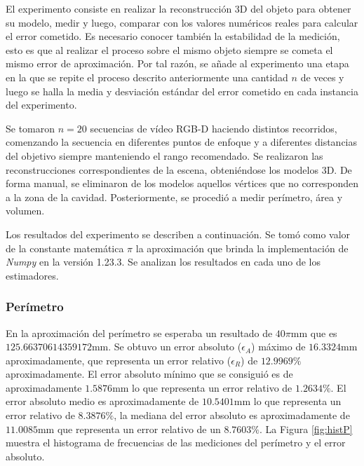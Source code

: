 El experimento consiste en realizar la reconstrucción 3D del objeto para obtener su modelo, medir y luego, comparar con los valores numéricos reales para calcular el error cometido. Es necesario conocer también la estabilidad de la medición, esto es que al realizar el proceso sobre el mismo objeto siempre se cometa el mismo error de aproximación. Por tal razón, se añade al experimento una etapa en la que se repite el proceso descrito anteriormente una cantidad $n$ de veces y luego se halla la media y desviación estándar del error cometido en cada instancia del experimento.

Se tomaron $n = 20$ secuencias de vídeo RGB-D haciendo distintos recorridos, comenzando la secuencia en diferentes puntos de enfoque y a diferentes distancias del objetivo siempre manteniendo el rango recomendado. Se realizaron las reconstrucciones correspondientes de la escena, obteniéndose los modelos 3D. De forma manual, se eliminaron de los modelos aquellos vértices que no corresponden a la zona de la cavidad. Posteriormente, se procedió a medir perímetro, área y volumen. 

Los resultados del experimento se describen a continuación. Se tomó como valor de la constante matemática $\pi$ la aproximación que brinda la implementación de \textit{Numpy} en la versión 1.23.3. Se analizan los resultados en cada uno de los estimadores.

\subsubsection{Perímetro}

En la aproximación del perímetro se esperaba un resultado de $40\pi\text{mm}$ que es $125.66370614359172\text{mm}$. Se obtuvo un error absoluto ($\epsilon_A$) máximo de $16.3324\text{mm}$ aproximadamente, que representa un error relativo ($\epsilon_R$) de $12.9969\%$ aproximadamente. El error absoluto mínimo que se consiguió es de aproximadamente $1.5876\text{mm}$ lo que representa un error relativo de $1.2634\%$. El error absoluto medio es aproximadamente de $10.5401\text{mm}$ lo que representa un error relativo de $8.3876\%$, la mediana del error absoluto es aproximadamente de $11.0085\text{mm}$ que representa un error relativo de un $8.7603\%$. La Figura \ref{fig:histP} muestra el histograma de frecuencias de las mediciones del perímetro y el error absoluto.

